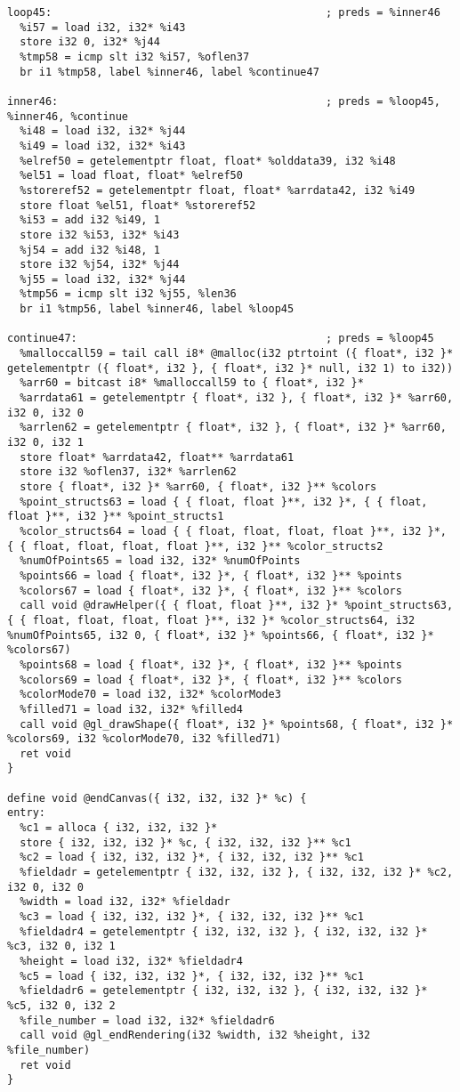 \documentclass[main.tex]{subfiles}
\begin{document}
{\begin{lstlisting}
loop45:                                           ; preds = %inner46
  %i57 = load i32, i32* %i43
  store i32 0, i32* %j44
  %tmp58 = icmp slt i32 %i57, %oflen37
  br i1 %tmp58, label %inner46, label %continue47

inner46:                                          ; preds = %loop45, %inner46, %continue
  %i48 = load i32, i32* %j44
  %i49 = load i32, i32* %i43
  %elref50 = getelementptr float, float* %olddata39, i32 %i48
  %el51 = load float, float* %elref50
  %storeref52 = getelementptr float, float* %arrdata42, i32 %i49
  store float %el51, float* %storeref52
  %i53 = add i32 %i49, 1
  store i32 %i53, i32* %i43
  %j54 = add i32 %i48, 1
  store i32 %j54, i32* %j44
  %j55 = load i32, i32* %j44
  %tmp56 = icmp slt i32 %j55, %len36
  br i1 %tmp56, label %inner46, label %loop45

continue47:                                       ; preds = %loop45
  %malloccall59 = tail call i8* @malloc(i32 ptrtoint ({ float*, i32 }* getelementptr ({ float*, i32 }, { float*, i32 }* null, i32 1) to i32))
  %arr60 = bitcast i8* %malloccall59 to { float*, i32 }*
  %arrdata61 = getelementptr { float*, i32 }, { float*, i32 }* %arr60, i32 0, i32 0
  %arrlen62 = getelementptr { float*, i32 }, { float*, i32 }* %arr60, i32 0, i32 1
  store float* %arrdata42, float** %arrdata61
  store i32 %oflen37, i32* %arrlen62
  store { float*, i32 }* %arr60, { float*, i32 }** %colors
  %point_structs63 = load { { float, float }**, i32 }*, { { float, float }**, i32 }** %point_structs1
  %color_structs64 = load { { float, float, float, float }**, i32 }*, { { float, float, float, float }**, i32 }** %color_structs2
  %numOfPoints65 = load i32, i32* %numOfPoints
  %points66 = load { float*, i32 }*, { float*, i32 }** %points
  %colors67 = load { float*, i32 }*, { float*, i32 }** %colors
  call void @drawHelper({ { float, float }**, i32 }* %point_structs63, { { float, float, float, float }**, i32 }* %color_structs64, i32 %numOfPoints65, i32 0, { float*, i32 }* %points66, { float*, i32 }* %colors67)
  %points68 = load { float*, i32 }*, { float*, i32 }** %points
  %colors69 = load { float*, i32 }*, { float*, i32 }** %colors
  %colorMode70 = load i32, i32* %colorMode3
  %filled71 = load i32, i32* %filled4
  call void @gl_drawShape({ float*, i32 }* %points68, { float*, i32 }* %colors69, i32 %colorMode70, i32 %filled71)
  ret void
}

define void @endCanvas({ i32, i32, i32 }* %c) {
entry:
  %c1 = alloca { i32, i32, i32 }*
  store { i32, i32, i32 }* %c, { i32, i32, i32 }** %c1
  %c2 = load { i32, i32, i32 }*, { i32, i32, i32 }** %c1
  %fieldadr = getelementptr { i32, i32, i32 }, { i32, i32, i32 }* %c2, i32 0, i32 0
  %width = load i32, i32* %fieldadr
  %c3 = load { i32, i32, i32 }*, { i32, i32, i32 }** %c1
  %fieldadr4 = getelementptr { i32, i32, i32 }, { i32, i32, i32 }* %c3, i32 0, i32 1
  %height = load i32, i32* %fieldadr4
  %c5 = load { i32, i32, i32 }*, { i32, i32, i32 }** %c1
  %fieldadr6 = getelementptr { i32, i32, i32 }, { i32, i32, i32 }* %c5, i32 0, i32 2
  %file_number = load i32, i32* %fieldadr6
  call void @gl_endRendering(i32 %width, i32 %height, i32 %file_number)
  ret void
}

\end{lstlisting}}
	
\end{document}
